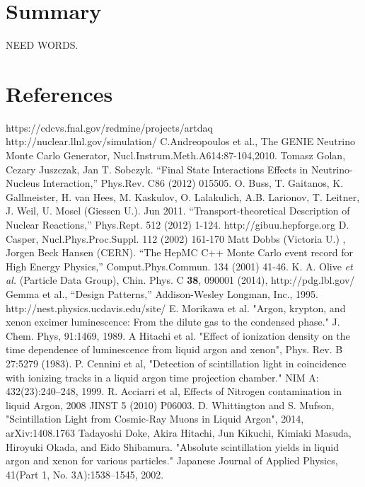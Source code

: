 \documentclass[12pt]{elsarticle}
\begin{document}
\section{Summary}
NEED WORDS.
\section{References}

\begin{thebibliography}{99}

 https://cdcvs.fnal.gov/redmine/projects/artdaq
 http://nuclear.llnl.gov/simulation/
 C.Andreopoulos et al., The GENIE Neutrino Monte Carlo Generator, Nucl.Instrum.Meth.A614:87-104,2010.
 Tomasz Golan, Cezary Juszczak, Jan T. Sobczyk. ``Final State Interactions Effects in Neutrino-Nucleus Interaction,'' Phys.Rev. C86 (2012) 015505.
 O. Buss, T. Gaitanos, K. Gallmeister, H. van Hees, M. Kaskulov, O. Lalakulich, A.B. Larionov, T. Leitner, J. Weil, U. Mosel (Giessen U.). Jun 2011. ``Transport-theoretical Description of Nuclear Reactions,'' Phys.Rept. 512 (2012) 1-124. http://gibuu.hepforge.org
 D. Casper, Nucl.Phys.Proc.Suppl. 112 (2002) 161-170
 Matt Dobbs (Victoria U.) , Jorgen Beck Hansen (CERN). ``The HepMC C++ Monte Carlo event record for High Energy Physics,'' Comput.Phys.Commun. 134 (2001) 41-46.
 K. A. Olive {\it et al.} (Particle Data Group), Chin. Phys. C {\bf 38}, 090001 (2014), http://pdg.lbl.gov/
 Gemma et al., ``Design Patterns,'' Addison-Wesley Longman, Inc., 1995. 
 http://nest.physics.ucdavis.edu/site/
 E. Morikawa et al. "Argon, krypton, and xenon excimer luminescence: From the dilute gas to the condensed phase." J. Chem. Phys, 91:1469, 1989.
 A Hitachi et al. "Effect of ionization density on the time dependence of luminescence from liquid argon and xenon", Phys. Rev. B 27:5279 (1983). 
 P. Cennini et al, "Detection of scintillation light in coincidence with ionizing tracks in a liquid argon time projection chamber." NIM A: 432(23):240–248, 1999. 
 R. Acciarri et al, Effects of Nitrogen contamination in liquid Argon, 2008 JINST 5 (2010) P06003.  
 D. Whittington and S. Mufson, "Scintillation Light from Cosmic-Ray Muons in Liquid Argon", 2014, arXiv:1408.1763
 Tadayoshi Doke, Akira Hitachi, Jun Kikuchi, Kimiaki Masuda, Hiroyuki Okada, and Eido Shibamura. "Absolute scintillation yields in liquid argon and xenon for various particles." Japanese Journal of Applied Physics, 41(Part 1, No. 3A):1538–1545, 2002.

\end{thebibliography}
\end{document}
